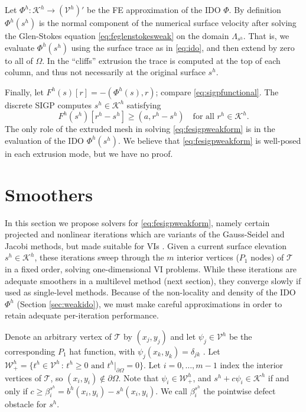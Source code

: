 \documentclass[letterpaper,final,12pt,reqno]{amsart}
\theoremstyle{claim}
\newcommand{\ip}[2]{\left(#1,#2\right)}
\numberwithin{equation}{section}
\numberwithin{figure}{section}
\numberwithin{table}{section}
\numberwithin{theorem}{section}
\begin{document}
Let $\Phi^h:\mathcal{K}^h \to (\mathcal{V}^h)'$ be the FE approximation of the IDO $\Phi$.  By definition $\Phi^h(s^h)$ is the normal component of the numerical surface velocity after solving the Glen-Stokes equation \eqref{eq:feglenstokesweak} on the domain $\Lambda_{s^h}$.  That is, we evaluate $\Phi^h(s^h)$ using the surface trace as in \eqref{eq:ido}, and then extend by zero to all of $\Omega$.  In the ``cliffs'' extrusion the trace is computed at the top of each column, and thus not necessarily at the original surface $s^h$.

Finally, let $F^h(s)[r] = - \ip{\Phi^h(s)}{r}$; compare \eqref{eq:sigpfunctional}.  The discrete SIGP computes $s^h \in \mathcal{K}^h$ satisfying
\begin{equation}
F^h(s^h)[r^h - s^h] \ge \ip{a}{r^h-s^h} \quad \text{for all } r^h \in \mathcal{K}^h. \label{eq:fesigpweakform}
\end{equation}
The only role of the extruded mesh in solving \eqref{eq:fesigpweakform} is in the evaluation of the IDO $\Phi^h(s^h)$.  We believe that \eqref{eq:fesigpweakform} is well-posed in each extrusion mode, but we have no proof.


\section{Smoothers} \label{sec:smoothers}

In this section we propose solvers for \eqref{eq:fesigpweakform}, namely certain projected and nonlinear iterations which are variants of the Gauss-Seidel and Jacobi methods, but made suitable for VIs \cite{KinderlehrerStampacchia1980}.  Given a current surface elevation $s^h\in \mathcal{K}^h$, these iterations sweep through the $m$ interior vertices ($P_1$ nodes) of $\mathcal{T}$ in a fixed order, solving one-dimensional VI problems.  While these iterations are adequate smoothers in a multilevel method (next section), they converge slowly if used as single-level methods.  Because of the non-locality and density of the IDO $\Phi^h$ (Section \ref{sec:weakido}), we must make careful approximations in order to retain adequate per-iteration performance.

Denote an arbitrary vertex of $\mathcal{T}$ by $(x_j,y_j)$ and let $\psi_j \in \mathcal{V}^h$ be the corresponding $P_1$ hat function, with $\psi_j(x_k,y_k)=\delta_{jk}$ \cite{Elmanetal2014}.  Let $\mathcal{W}_+^h = \{t^h \in \mathcal{V}^h \,:\, t^h \ge 0 \text{ and } t^h|_{\partial\Omega} = 0\}$.  Let $i=0,\dots,m-1$ index the interior vertices of $\mathcal{T}$, so $(x_i,y_i) \notin \partial\Omega$.  Note that $\psi_i \in \mathcal{W}_+^h$, and $s^h + c \psi_i \in \mathcal{K}^h$ if and only if $c\ge \beta_i^{s^h} = b^h(x_i,y_i) - s^h(x_i,y_i)$.  We call $\beta_i^{s^h}$ the pointwise defect obstacle \cite{GraeserKornhuber2009} for $s^h$.
\end{document}
